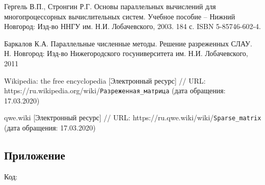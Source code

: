 \documentclass{report}
\begin{document}
\begin{thebibliography}{1}

 Гергель В.П., Стронгин Р.Г. Основы параллельных вычислений для многопроцессорных вычислительных систем. Учебное пособие – Нижний Новгород: Изд-во ННГУ им. Н.И. Лобачевского, 2003. 184 с. ISBN 5-85746-602-4.

 Баркалов К.А. Параллельные численные методы. Решение разреженных СЛАУ. Н. Новгород: Изд-во Нижегородского госуниверситета им. Н.И. Лобачевского, 2011

 Wikipedia: the free encyclopedia [Электронный ресурс] // URL: https://ru.wikipedia.org/wiki/\verb|Разреженная_матрица| (дата обращения: 17.03.2020)

 qwe.wiki [Электронный ресурс] // URL: https://ru.qwe.wiki/wiki/\verb|Sparse_matrix| (дата обращения: 17.03.2020)

\end{thebibliography}
\newpage

\begin{center}\section*{Приложение}\end{center}
Код:
















\end{document}

